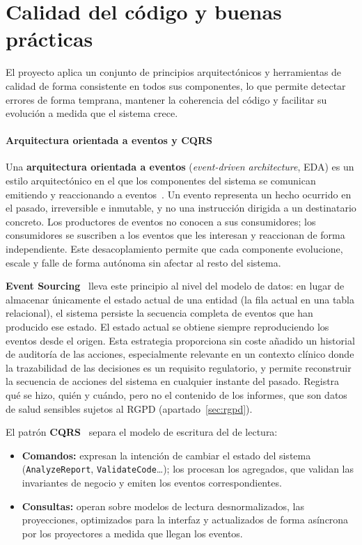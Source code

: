 \chapter{Calidad del código y buenas prácticas}
\label{cap:AnexoO}

El proyecto aplica un conjunto de principios arquitectónicos y herramientas de calidad de forma consistente en todos sus componentes, lo que permite detectar errores de forma temprana, mantener la coherencia del código y facilitar su evolución a medida que el sistema crece.

\subsubsection{Arquitectura orientada a eventos y CQRS}

Una \textbf{arquitectura orientada a eventos} (\emph{event-driven architecture}, EDA) es un estilo arquitectónico en el que los componentes del sistema se comunican emitiendo y reaccionando a eventos~\cite{Fowler02}. Un evento representa un hecho ocurrido en el pasado, irreversible e inmutable, y no una instrucción dirigida a un destinatario concreto. Los productores de eventos no conocen a sus consumidores; los consumidores se suscriben a los eventos que les interesan y reaccionan de forma independiente. Este desacoplamiento permite que cada componente evolucione, escale y falle de forma autónoma sin afectar al resto del sistema.

\textbf{Event Sourcing}~\cite{Young10} lleva este principio al nivel del modelo de datos: en lugar de almacenar únicamente el estado actual de una entidad (la fila actual en una tabla relacional), el sistema persiste la secuencia completa de eventos que han producido ese estado. El estado actual se obtiene siempre reproduciendo los eventos desde el origen. Esta estrategia proporciona sin coste añadido un historial de auditoría de las acciones, especialmente relevante en un contexto clínico donde la trazabilidad de las decisiones es un requisito regulatorio, y permite reconstruir la secuencia de acciones del sistema en cualquier instante del pasado. Registra qué se hizo, quién y cuándo, pero no el contenido de los informes, que son datos de salud sensibles sujetos al RGPD (apartado~\ref{sec:rgpd}).

El patrón \textbf{CQRS}~\cite{Young10} separa el modelo de escritura del de lectura:

\begin{itemize}
 \item \textbf{Comandos:} expresan la intención de cambiar el estado del sistema (\texttt{AnalyzeReport}, \texttt{ValidateCode}…); los procesan los agregados, que validan las invariantes de negocio y emiten los eventos correspondientes.
 \item \textbf{Consultas:} operan sobre modelos de lectura desnormalizados, las proyecciones, optimizados para la interfaz y actualizados de forma asíncrona por los proyectores a medida que llegan los eventos.
\end{itemize}


